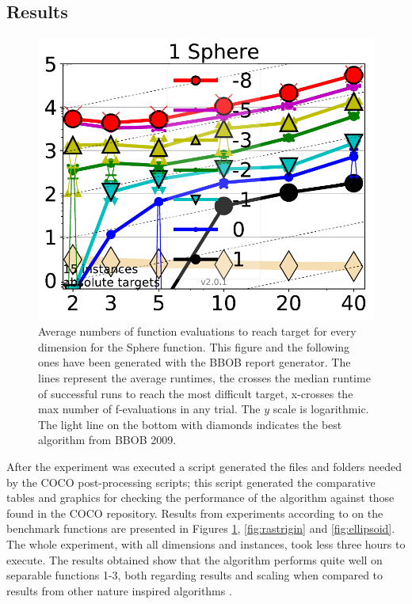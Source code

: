 


\subsection{Results}
\label{sec:results}
\begin{figure}[h!tbp]
    \centering
        \includegraphics[width=5in]{img/Sphere.pdf}
    \caption{Average numbers of function evaluations to reach target
      for every dimension for the Sphere function. This figure and the
    following ones have been generated with the BBOB report
    generator. The lines represent the average runtimes, the crosses
    the median runtime of successful runs to reach the most difficult
    target, x-crosses the max number of f-evaluations in any
    trial. The $y$ scale is logarithmic. The light line on the bottom
    with diamonds indicates the best algorithm from BBOB 2009. }
\label{fig:sphere}
\end{figure}
%
After the experiment was executed a script generated 
the files and folders needed by the COCO post-processing 
scripts; this script generated the comparative tables and
graphics for checking the performance of the algorithm against
those found in the COCO repository. Results from experiments 
according to \cite{hansen2016coco} on the benchmark functions 
are presented in Figures \ref{fig:sphere}, \ref{fig:rastrigin} and \ref{fig:ellipsoid}.
The whole experiment, with all dimensions and instances, took 
less three hours to execute. %
The results obtained show that the 
algorithm performs quite well on separable functions 1-3, 
both regarding results and scaling when compared to results 
from other nature inspired algorithms \cite{hansen2010bbob}. %



